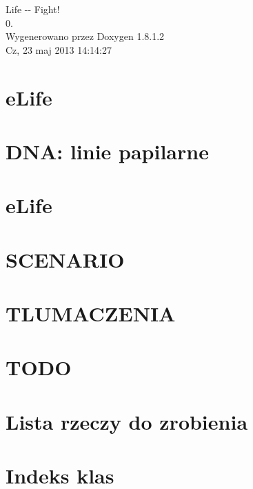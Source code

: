 \documentclass{article}
\begin{document}
\hypersetup{pageanchor=false,citecolor=blue}
\begin{titlepage}
\vspace*{7cm}
\begin{center}
{\Large Life -\/-\/ Fight! \\[1ex]\large 0. }\\
\vspace*{1cm}
{\large Wygenerowano przez Doxygen 1.8.1.2}\\
\vspace*{0.5cm}
{\small Cz, 23 maj 2013 14:14:27}\\
\end{center}
\end{titlepage}
\tableofcontents
{}
\hypersetup{pageanchor=true,citecolor=blue}
\section{e\-Life}
\label{md_func}
\hypertarget{md_func}{}

\section{D\-N\-A\-: linie papilarne}
\label{md_GENETYKA}
\hypertarget{md_GENETYKA}{}

\section{e\-Life}
\label{md_README}
\hypertarget{md_README}{}

\section{S\-C\-E\-N\-A\-R\-I\-O}
\label{md_SCENARIO}
\hypertarget{md_SCENARIO}{}

\section{T\-L\-U\-M\-A\-C\-Z\-E\-N\-I\-A}
\label{md_TLUMACZENIA}
\hypertarget{md_TLUMACZENIA}{}

\section{T\-O\-D\-O}
\label{md_TODO}
\hypertarget{md_TODO}{}

\section{Lista rzeczy do zrobienia}
\label{todo}
\hypertarget{todo}{}

\section{Indeks klas}

\end{document}
